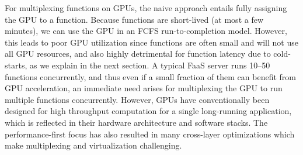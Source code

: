 For multiplexing functions on GPUs, the naive approach entails fully assigning the GPU to a function. 
Because functions are short-lived (at most a few minutes), we can use the GPU in an FCFS run-to-completion model. 
However, this leads to poor GPU utilization since functions are often small and will not use all GPU resources, and also highly detrimental for function latency due to cold-starts, as we explain in the next section. 
A typical FaaS server runs 10--50 functions concurrently, and thus even if a small fraction of them can benefit from GPU acceleration, an immediate need arises for multiplexing the GPU to run multiple functions concurrently. 
However, GPUs have conventionally been designed for high throughput computation for a single long-running application, which is reflected in their hardware architecture and software stacks.
The performance-first focus has also resulted in many cross-layer optimizations which make multiplexing and virtualization challenging. 

